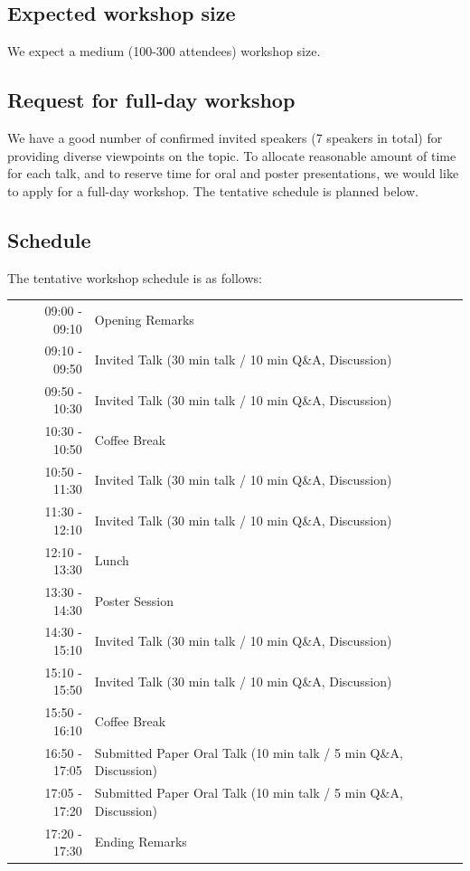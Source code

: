 \documentclass{article}
\begin{document}
\subsection{Expected workshop size}
We expect a medium (100-300 attendees) workshop size.

\subsection{Request for full-day workshop}
We have a good number of confirmed invited speakers (7 speakers in total) for providing diverse viewpoints on the topic. To allocate reasonable amount of time for each talk, and to reserve time for oral and poster presentations, we would like to apply for a full-day workshop. The tentative schedule is planned below.

\subsection{Schedule}
The tentative workshop schedule is as follows:

\begin{tabular}{rl}
    \\
    09:00 - 09:10 & Opening Remarks \\
    09:10 - 09:50 & Invited Talk (30 min talk / 10 min Q\&A, Discussion) \\
    09:50 - 10:30 & Invited Talk (30 min talk / 10 min Q\&A, Discussion) \\
    10:30 - 10:50 & Coffee Break \\
    10:50 - 11:30 & Invited Talk (30 min talk / 10 min Q\&A, Discussion) \\
    11:30 - 12:10 & Invited Talk (30 min talk / 10 min Q\&A, Discussion) \\
    12:10 - 13:30 & Lunch \\
    13:30 - 14:30 & Poster Session \\
    14:30 - 15:10 & Invited Talk (30 min talk / 10 min Q\&A, Discussion) \\
    15:10 - 15:50 & Invited Talk (30 min talk / 10 min Q\&A, Discussion) \\
    15:50 - 16:10 & Coffee Break \\
    16:50 - 17:05 & Submitted Paper Oral Talk (10 min talk / 5 min Q\&A, Discussion) \\
    17:05 - 17:20 & Submitted Paper Oral Talk (10 min talk / 5 min Q\&A, Discussion) \\
    17:20 - 17:30 & Ending Remarks \\
\end{tabular}
\end{document}
